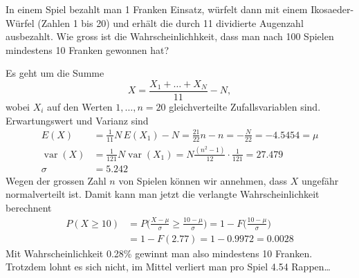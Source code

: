 In einem Spiel bezahlt man 1 Franken Einsatz, würfelt dann mit
einem Ikosaeder-Würfel (Zahlen 1 bis 20) und erhält die durch 11 dividierte
Augenzahl ausbezahlt. Wie gross ist die Wahrscheinlichhkeit,
dass man nach 100 Spielen mindestens 10 Franken gewonnen hat?

\begin{loesung}
Es geht um die Summe
\[
X=\frac{X_1+\dots +X_N}{11} - N,
\]
wobei $X_i$ auf den
Werten $1,\dots,n=20$ gleichverteilte Zufallsvariablen sind.
Erwartungswert und Varianz
sind
\begin{align*}
E(X)&=\frac1{11}N\,E(X_1)-N=\frac{21}{22}n-n=-\frac{N}{22}
=-4.5454=\mu
\\
\operatorname{var}(X)&=\frac1{121}N\operatorname{var}(X_1)=N\frac{(n^2-1)}{12}\cdot\frac1{121}
=27.479
\\
\sigma&=5.242
\end{align*}
Wegen der grossen Zahl $n$ von Spielen können wir annehmen, dass
$X$ ungefähr normalverteilt ist.
Damit kann man jetzt die verlangte Wahrscheinlichkeit berechnent
\begin{align*}
P(X \ge 10)&=P\biggl(
\frac{X-\mu}{\sigma}\ge\frac{10-\mu}{\sigma}
\biggr)
=1-F\biggl(
\frac{10-\mu}{\sigma}
\biggr)
\\
&=1-F(2.77)=1-0.9972=0.0028
\end{align*}
Mit Wahrscheinlichkeit 0.28\% gewinnt man also mindestens 10 Franken.
Trotzdem lohnt es sich nicht, im Mittel verliert man pro Spiel
4.54 Rappen\dots
\end{loesung}

